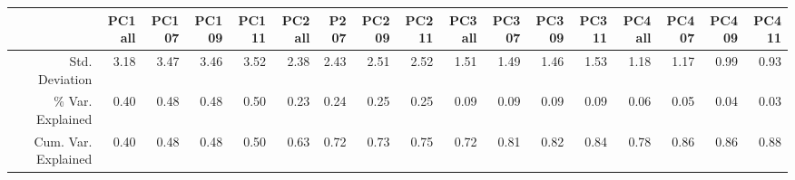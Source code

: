 \begin{table}[ht]
\centering
\begin{tabular}{rrrrrrrrrrrrrrrrr}
  \hline
 & PC1all & PC107 & PC109 & PC111 & PC2all & P207 & PC209 & PC211 & PC3all & PC307 & PC309 & PC311 & PC4all & PC407 & PC409 & PC411 \\ 
  \hline
Std. Deviation & 3.18 & 3.47 & 3.46 & 3.52 & 2.38 & 2.43 & 2.51 & 2.52 & 1.51 & 1.49 & 1.46 & 1.53 & 1.18 & 1.17 & 0.99 & 0.93 \\ 
  \% Var. Explained & 0.40 & 0.48 & 0.48 & 0.50 & 0.23 & 0.24 & 0.25 & 0.25 & 0.09 & 0.09 & 0.09 & 0.09 & 0.06 & 0.05 & 0.04 & 0.03 \\ 
  Cum. Var. Explained & 0.40 & 0.48 & 0.48 & 0.50 & 0.63 & 0.72 & 0.73 & 0.75 & 0.72 & 0.81 & 0.82 & 0.84 & 0.78 & 0.86 & 0.86 & 0.88 \\ 
   \hline
\end{tabular}
\end{table}
